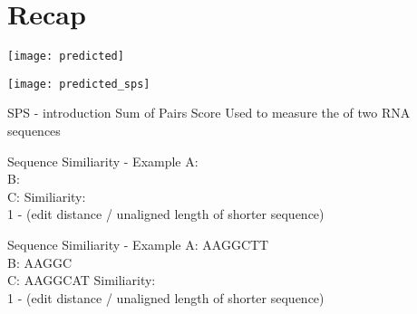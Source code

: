 \section{Recap}



\begin{frame}[c]{}
    \center
    \texttt{[image: predicted]}
\end{frame}


\begin{frame}[c]{}
    \center
    \texttt{[image: predicted\_sps]}
\end{frame}


\begin{frame}[c]{SPS - introduction}
    Sum of Pairs Score
    \newline
    \newline
    \pause
    Used to measure the  of two RNA sequences
\end{frame}


\begin{frame}[c]{Sequence Similiarity - Example}
    A: \only<4-5>{AAGGC} \\
    B:  \\
    C:  \newline
    \newline
    Similiarity:  \\
    1 - (edit distance / unaligned length of shorter sequence)
\end{frame}


\begin{frame}[c]{Sequence Similiarity - Example}
    A: {\color{ForestGreen}AAGGC}{\color{red}T}{\color{ForestGreen}T} \\
    B: AAGGC \\
    C: {\color{ForestGreen}AAGGC}{\color{red}A}{\color{ForestGreen}T} \newline
    \newline
    Similiarity:  \\
    1 - (edit distance / unaligned length of shorter sequence)
\end{frame}


